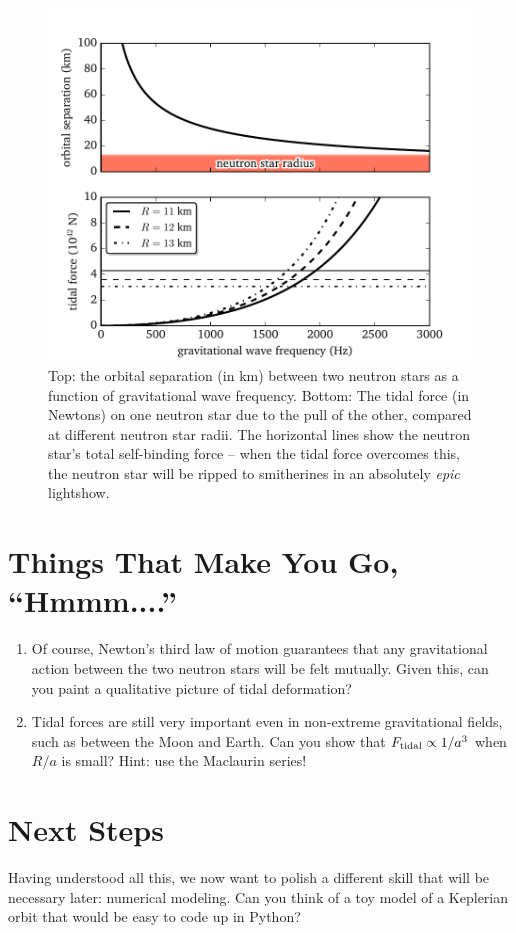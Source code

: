 \documentclass[11pt]{article}
\begin{document}
\begin{figure}
\centering
\includegraphics[scale=1]{tidal_notes/newtonian_tidal_forces.pdf}
\caption{\label{fig:NS_tides}Top: the orbital separation (in km) between two neutron stars as a function of gravitational wave frequency. Bottom: The tidal force (in Newtons) on one neutron star due to the pull of the other, compared at different neutron star radii. The horizontal lines show the neutron star's total self-binding force -- when the tidal force overcomes this, the neutron star will be ripped to smitherines in an absolutely \emph{epic} lightshow.}
\end{figure}

\section*{Things That Make You Go, ``Hmmm....''}

\begin{enumerate}

\item Of course, Newton's third law of motion guarantees that any gravitational action between the two neutron stars will be felt mutually. Given this, can you paint a qualitative picture of tidal deformation?

\item Tidal forces are still very important even in non-extreme gravitational fields, such as between the Moon and Earth. Can you show that $F_{\rm tidal} \propto 1/a^3$ when $R/a$ is small? Hint: use the Maclaurin series!

\end{enumerate}

\section*{Next Steps}

\hspace{15pt} Having understood all this, we now want to polish a different skill that will be necessary later: numerical modeling. Can you think of a toy model of a Keplerian orbit that would be easy to code up in Python?
\end{document}
